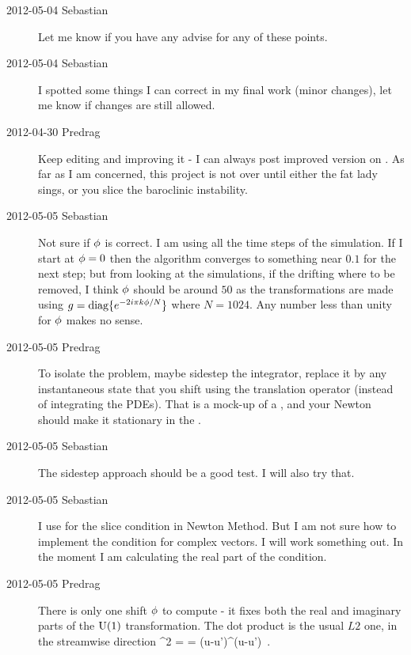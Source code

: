 \begin{description}
\item[2012-05-04 Sebastian] Let me know if you have any advise for any of
these points.


\item[2012-05-04 Sebastian]
I spotted some things I can correct in my final work (minor changes), let
me know if changes are still allowed.

\item[2012-04-30 Predrag]
Keep editing and improving it - I can always post improved version on
. As far as I
am concerned, this project is not over until either the fat lady sings,
or you slice the baroclinic instability.

\item[2012-05-05 Sebastian]
Not sure if ${\bf \phi}$ is correct. I am using all the time steps of the
simulation. If I start at ${\bf \phi}=0$ then the algorithm converges to
something near $0.1$  for the next step; but from looking at the
simulations, if the drifting where to be removed, I think ${\bf \phi}$
should be around $50$ as the transformations are made using
$g=\textrm{diag}\{e^{-2 i \pi k {\bf \phi}/N}\}$ where $N=1024$. Any
number less than unity for ${\bf \phi}$ makes no sense.
\item[2012-05-05 Predrag]
To isolate the problem, maybe sidestep the integrator, replace it by any
instantaneous state that you shift using the translation operator
(instead of integrating the PDEs). That is a mock-up of a \reqv, and your
Newton should make it stationary in the \slice.
\item[2012-05-05 Sebastian]
The sidestep approach should be a good test. I will also try that.

\item[2012-05-05 Sebastian]
I use  for the slice condition in Newton Method. But I am not
sure how to implement the {\chartBord} condition for complex vectors. I
will work something out. In the moment I am calculating the real part of
the condition.

\item[2012-05-05 Predrag] There is only one shift ${\bf \phi}$ to compute -
it fixes both the real and imaginary parts of the $\textrm{U}(1)$
transformation.
The dot product is the usual
$L2$ one, in the streamwise direction
\beq
  ^2  =  =
\Lint{\pSpace} ({u}-{u}')^\dagger \cdot ({u}-{u}')
\,.
\label{CmplxNorm}
\eeq


\end{description}
